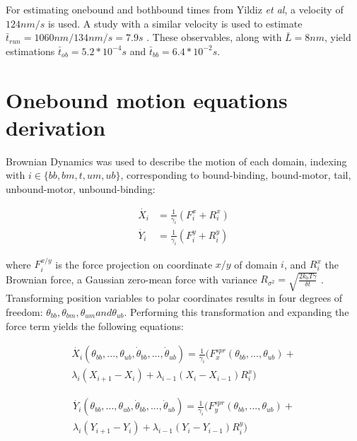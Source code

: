 \documentclass[9pt,twocolumn,twoside]{pnas-new}
\begin{document}
{  For estimating onebound and bothbound times from Yildiz \textit{et al}\cite{yildiz}, a velocity of $124 nm/s$ is used. A study with a similar velocity is used to estimate $\bar{t}_{run} = 1060 nm / 134 nm / s = 7.9s$ \cite{weihongpaper}. These observables, along with $\bar{L} = 8nm$, yield estimations $\bar{t}_{ob} = 5.2*10^{-4}s$ and $\bar{t}_{bb} = 6.4 * 10^{-2}s$.\\

  \section*{Onebound motion equations derivation}
  Brownian Dynamics was used to describe the motion of each domain, indexing with $i \in \{bb, bm, t, um, ub\}$, corresponding to bound-binding, bound-motor, tail, unbound-motor, unbound-binding:

  \begin{align}
    \dot{X_i} &= \frac{1}{\gamma_i}\left(F^x_i + R^x_i\right)\\
    \dot{Y_i} &= \frac{1}{\gamma_i}\left(F^y_i + R^y_i\right)
  \end{align}

  where $F^{x/y}_i$ is the force projection on coordinate $x/y$ of domain $i$, and $R^x_i$ the Brownian force, a Gaussian zero-mean force with variance $R_{\sigma^2} = \sqrt{\frac{2k_bT\gamma}{\delta t}}$ \cite{einstein}. Transforming position variables to polar coordinates results in four degrees of freedom: $\theta_{bb}, \theta_{bm}, \theta_{um} and \theta_{ub}$. Performing this transformation and expanding the force term yields the following equations:

  \begin{multline}
    \dot{X_i}\left(\theta_{bb}, ..., \theta_{ub}, \dot{\theta}_{bb}, ..., \dot{\theta}_{ub}\right) = \frac{1}{\gamma_i}\big(F^{spr}_x(\theta_{bb}, ..., \theta_{ub}) + \\
    \lambda_i\left(X_{i+1}-X_i\right) + \lambda_{i-1}\left(X_i-X_{i-1}\right)R^x_i\big)
    \label{eq:ob-system}
  \end{multline}

  \begin{multline}
    \dot{Y_i}\left(\theta_{bb}, ..., \theta_{ub}, \dot{\theta}_{bb}, ..., \dot{\theta}_{ub}\right) = \frac{1}{\gamma_i}\big(F^{spr}_y(\theta_{bb}, ..., \theta_{ub}) + \\
    \lambda_i\left(Y_{i+1}-Y_i\right) + \lambda_{i-1}\left(Y_i-Y_{i-1}\right)R^y_i\big)
    \label{eq:ob-system}
  \end{multline}

}
\end{document}
